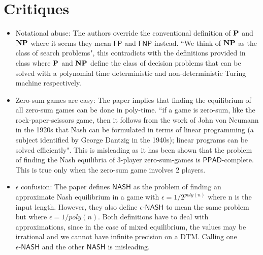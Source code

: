 \documentclass[11pt]{article}
\newcommand{\FP}{\mathsf{FP}}
\newcommand{\FNP}{\mathsf{FNP}}
\newcommand{\PPADc}{\mathsf{PPAD}\text{-complete}}
\newcommand{\NASH}{\mathsf{NASH}}
\newcommand{\eNASH}{\mathsf{\text{$\epsilon$-}NASH}}
\begin{document}
\section{Critiques}
\begin{itemize}
    \item Notational abuse: The authors override the conventional definition of $\P$ and $\NP$ where it seems they mean $\FP$ and $\FNP$ instead. ``We think of $\NP$ as the class of search problems", this contradicts with the definitions provided in class where $\P$ and $\NP$ define the class of decision problems that can be solved with a polynomial time deterministic and non-deterministic Turing machine respectively.
    \item Zero-sum games are easy: The paper implies that finding the equilibrium of all zero-sum games can be done in poly-time. ``if  a  game  is  zero-sum, like the rock-paper-scissors game, then it follows from the work of John von Neumann in the 1920s that Nash can be  formulated  in  terms  of  linear  programming  (a  subject identified by George Dantzig in the 1940s); linear programs can be solved efficiently". This is misleading as it has been shown that the problem of finding the Nash equilibria of 3-player zero-sum-games is $\PPADc$. This is true only when the zero-sum game involves 2 players.
    \item $\epsilon$ confusion: The paper defines $\NASH$ as the problem of finding an approximate Nash equilibrium in a game with $\epsilon = 1/2^{poly(n)}$ where n is the input length. However, they also define $\eNASH$ to mean the same problem but where $\epsilon = 1/poly(n)$. Both definitions have to deal with approximations, since in the case of mixed equilibrium, the values may be irrational and we cannot have infinite precision on a DTM. Calling one $\eNASH$ and the other $\NASH$ is misleading.
\end{itemize}

% 
% 
\medskip

\printbibliography
\end{document}
